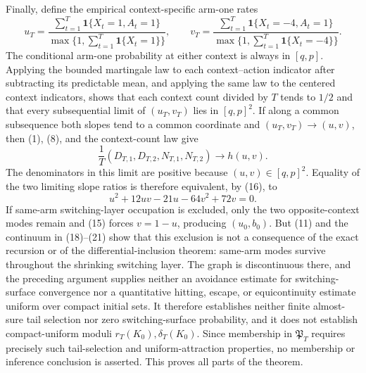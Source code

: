 Finally, define the empirical context-specific arm-one rates
\[
 u_T=\frac{\sum_{t=1}^T\mathbf1\{X_t=1,A_t=1\}}
 {\max\{1,\sum_{t=1}^T\mathbf1\{X_t=1\}\}},\qquad
 v_T=\frac{\sum_{t=1}^T\mathbf1\{X_t=-4,A_t=1\}}
 {\max\{1,\sum_{t=1}^T\mathbf1\{X_t=-4\}\}}.
\]
The conditional arm-one probability at either context is always in \([q,p]\).  Applying the bounded martingale law to each context--action indicator after subtracting its predictable mean, and applying the same law to the centered context indicators, shows that each context count divided by \(T\) tends to \(1/2\) and that every subsequential limit of \((u_T,v_T)\) lies in \([q,p]^2\).  If along a common subsequence both slopes tend to a common coordinate and \((u_T,v_T)\to(u,v)\), then (1), (8), and the context-count law give
\[
 \frac1T(D_{T,1},D_{T,2},N_{T,1},N_{T,2})\longrightarrow h(u,v).
\]
The denominators in this limit are positive because \((u,v)\in[q,p]^2\).  Equality of the two limiting slope ratios is therefore equivalent, by (16), to
\[
 u^2+12uv-21u-64v^2+72v=0.
\]
If same-arm switching-layer occupation is excluded, only the two opposite-context modes remain and (15) forces \(v=1-u\), producing \((u_0,b_0)\).  But (11) and the continuum in (18)--(21) show that this exclusion is not a consequence of the exact recursion or of the differential-inclusion theorem: same-arm modes survive throughout the shrinking switching layer.  The graph is discontinuous there, and the preceding argument supplies neither an avoidance estimate for switching-surface convergence nor a quantitative hitting, escape, or equicontinuity estimate uniform over compact initial sets.  It therefore establishes neither finite almost-sure tail selection nor zero switching-surface probability, and it does not establish compact-uniform moduli \(r_T(K_0),\delta_T(K_0)\).  Since membership in \(\mathfrak P_T\) requires precisely such tail-selection and uniform-attraction properties, no membership or inference conclusion is asserted.  This proves all parts of the theorem.